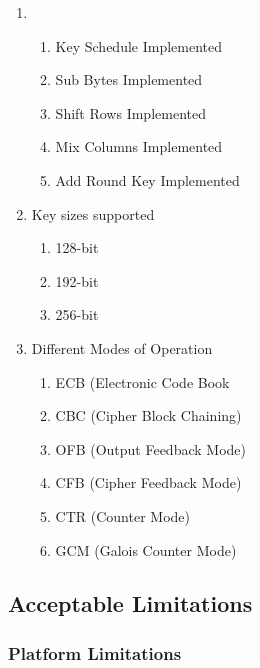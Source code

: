 \begin{enumerate}
\item{
    \begin{enumerate}
        \item{Key Schedule Implemented}
        \item{Sub Bytes Implemented}
        \item{Shift Rows Implemented}
        \item{Mix Columns Implemented}
        \item{Add Round Key Implemented}
    \end{enumerate}
}

\item{Key sizes supported
	\begin{enumerate}
		\item{128-bit}
		\item{192-bit}
		\item{256-bit}
	\end{enumerate}
}
\item{
Different Modes of Operation
	\begin{enumerate}
		\item{ECB (Electronic Code Book}
		\item{CBC (Cipher Block Chaining)}
		\item{OFB (Output Feedback Mode)}
		\item{CFB (Cipher Feedback Mode)}
		\item{CTR (Counter Mode)}
		\item{GCM (Galois Counter Mode)}
	\end{enumerate}
}
\end{enumerate}


\subsection{Acceptable Limitations}
\subsubsection{Platform Limitations}


